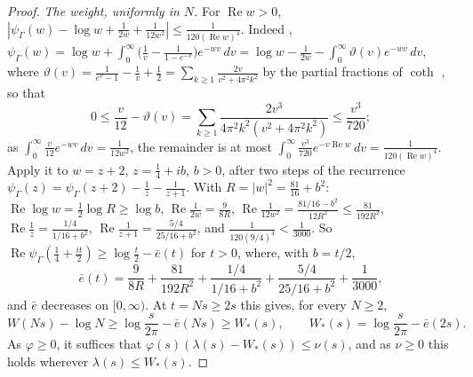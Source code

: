 \documentclass[11pt]{article}
\theoremstyle{definition}
\begin{document}
\begin{proof}
\emph{The weight, uniformly in $N$.} For $\operatorname{Re} w > 0$, $|\psi_\Gamma(w) - \log w + \frac{1}{2w} +
\frac{1}{12w^2}| \le \frac{1}{120(\operatorname{Re} w)^4}$. Indeed \cite[(5.9.13)]{dlmf},
$\psi_\Gamma(w) = \log w + \int_0^\infty \big(\frac1v - \frac{1}{1 - e^{-v}}\big)
e^{-wv}\,dv = \log w - \frac{1}{2w} - \int_0^\infty \vartheta(v) e^{-wv}\,dv$, where $\vartheta(v) = \frac{1}{e^v - 1} -
\frac1v + \frac12 =
\sum_{k \ge 1} \frac{2v}{v^2 + 4\pi^2k^2}$ by the partial fractions of $\coth$ \cite[(4.36.3)]{dlmf}, so that
\[
0 \le \frac{v}{12} - \vartheta(v) = \sum_{k \ge 1} \frac{2v^3}{4\pi^2k^2(v^2 + 4\pi^2k^2)} \le \frac{v^3}{720};
\]
as $\int_0^\infty \frac{v}{12} e^{-wv}\,dv = \frac{1}{12w^2}$, the remainder is at most $\int_0^\infty \frac{v^3}{720}
e^{-v \operatorname{Re} w}\,dv = \frac{1}{120(\operatorname{Re} w)^4}$. Apply it to $w = z + 2$, $z = \frac14 + ib$, $b
> 0$, after two steps of the recurrence
$\psi_\Gamma(z) = \psi_\Gamma(z + 2) - \frac1z - \frac{1}{z + 1}$. With $R = |w|^2 = \frac{81}{16} + b^2$:
$\operatorname{Re} \log w = \frac12 \log R \ge \log b$, $\operatorname{Re} \frac{1}{2w} = \frac{9}{8R}$,
$\operatorname{Re} \frac{1}{12w^2} = \frac{81/16 - b^2}{12R^2} \le \frac{81}{192R^2}$, $\operatorname{Re} \frac1z =
\frac{1/4}{1/16 + b^2}$, $\operatorname{Re} \frac{1}{z + 1} = \frac{5/4}{25/16 + b^2}$, and $\frac{1}{120(9/4)^4} <
\frac{1}{3000}$. So $\operatorname{Re} \psi_\Gamma(\frac14 + \frac{it}2) \ge \log\frac t2 - \bar e(t)$ for $t > 0$,
where, with $b = t/2$,
\[
\bar e(t) = \frac{9}{8R} + \frac{81}{192R^2} + \frac{1/4}{1/16 + b^2} + \frac{5/4}{25/16 + b^2} + \frac{1}{3000},
\]
and $\bar e$ decreases on $[0, \infty)$. At $t = Ns \ge 2s$ this gives, for every $N \ge 2$,
\[
W(Ns) - \log N \ge \log\frac{s}{2\pi} - \bar e(Ns) \ge W_*(s), \qquad W_*(s) = \log\frac{s}{2\pi} - \bar e(2s).
\]
As $\varphi \ge 0$, it suffices that $\varphi(s)(\lambda(s)
- W_*(s)) \le \nu(s)$, and as $\nu \ge 0$ this holds wherever
$\lambda(s) \le W_*(s)$.


\end{proof}
\end{document}
